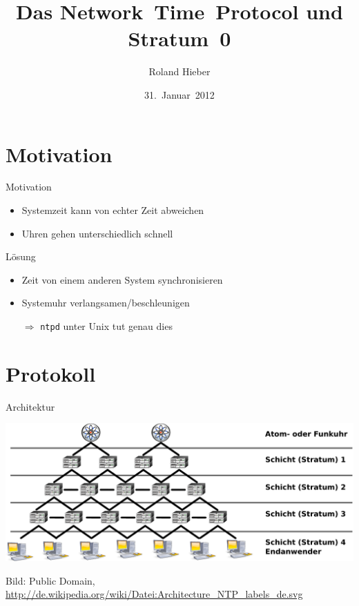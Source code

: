 \documentclass{beamer}
\author{Roland Hieber}
\title{Das Network~Time~Protocol und Stratum~0}
\institute{Stratum~0~e.~V.}
\date{31.~Januar~2012}
\begin{document}
\begin{frame}
  \titlepage
  \thispagestyle{empty}
\end{frame}

\section{Motivation}
\begin{frame}{Motivation}
  \begin{itemize}
    \item Systemzeit kann von echter Zeit abweichen
    \item Uhren gehen unterschiedlich schnell
  \end{itemize}

  \pause

  \begin{block}{Lösung}
    \begin{itemize}
      \item Zeit von einem anderen System synchronisieren
      \item Systemuhr verlangsamen/beschleunigen
      \item[$\Rightarrow$] \texttt{ntpd} unter Unix tut genau dies
    \end{itemize}
  \end{block}
\end{frame}

\section{Protokoll}
\begin{frame}{Architektur}
  \begin{center}
    \includegraphics[width=\textwidth]{Architecture_NTP_labels_de.pdf}\par
    \tiny Bild: Public Domain,
    \url{http://de.wikipedia.org/wiki/Datei:Architecture_NTP_labels_de.svg}
  \end{center}
\end{frame}
\end{document}
